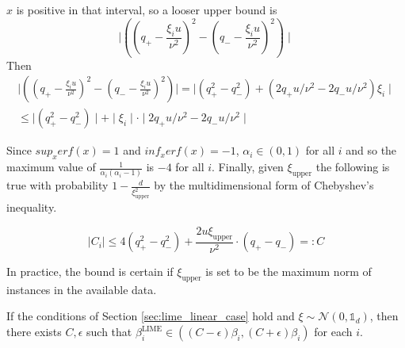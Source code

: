         $x$ is positive in that interval, so a looser upper bound is
        \begin{equation*}
            \mid ((q_+-\frac{\xi_i u}{\nu^2})^2 - (q_--\frac{\xi_i u}{\nu^2})^2)  \mid
        \end{equation*}
        Then
        \begin{align*}
             \mid ((q_+-\frac{\xi_i u}{\nu^2})^2 - (q_--\frac{\xi_i u}{\nu^2})^2)  \mid = \mid (q_+^2 - q_-^2) + (2q_+u/\nu^2 - 2q_-u/\nu^2)\xi_i\mid \\
             \leq \mid (q_+^2 - q_-^2)\mid + \mid \xi_i \mid \cdot \mid  2q_+u/\nu^2 - 2q_-u/\nu^2\mid
        \end{align*}

        Since $sup_x erf(x) = 1$ and $inf_x erf(x) = -1$, $\alpha_i \in (0,1)$ for all $i$ and so the maximum value of $\frac{1}{\alpha_i(\alpha_i -1)}$ is $-4$ for all $i$. Finally, given $\xi_{\text{upper}}$ the following is true  with probability $1-\frac{d}{\xi_{\text{upper}}^2}$ by the multidimensional form of Chebyshev's inequality.

        \begin{equation*}
            \mid C_i \mid \leq 4(q_+^2 - q_-^2) + \frac{2u\xi_{\text{upper}}}{\nu^2} \cdot  (q_+ - q_-) =: C
        \end{equation*}

        In practice, the bound is certain if $\xi_{\text{upper}}$ is set to be the maximum norm of instances in the available data. 
        
    \begin{theorem}
        If the conditions of Section \ref{sec:lime_linear_case} hold and $\xi \sim \mathcal{N}(0,\mathds{1}_d)$, then there exists $C,\epsilon$ such that $\beta^{\text{LIME}}_i  \in ((C - \epsilon) \beta_i, (C+\epsilon)\beta_i)$ for each $i$. 
    \end{theorem}

